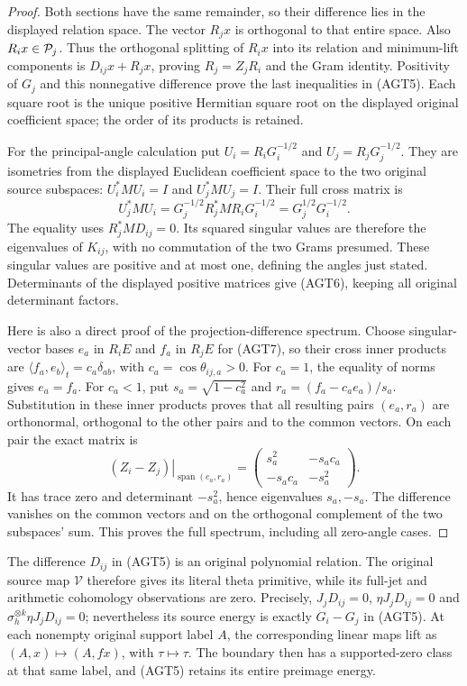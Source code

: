 \begin{proof}
Both sections have the same remainder, so their difference lies
in the displayed relation space. The vector $R_jx$ is orthogonal
to that entire space. Also $R_ix\in\mathcal P_j$. Thus the orthogonal
splitting of $R_ix$ into its relation and minimum-lift components
is $D_{ij}x+R_jx$, proving $R_j=Z_jR_i$ and the Gram identity.
Positivity of $G_j$ and this nonnegative difference prove the
last inequalities in (AGT5). Each square root is the unique
positive Hermitian square root on the displayed original
coefficient space; the order of its products is retained.

For the principal-angle calculation put
$U_i=R_iG_i^{-1/2}$ and $U_j=R_jG_j^{-1/2}$.
They are isometries from the displayed Euclidean coefficient
space to the two original source subspaces: $U_i^*MU_i=I$
and $U_j^*MU_j=I$. Their full cross matrix is
\[
 U_j^*MU_i=G_j^{-1/2}R_j^*MR_iG_i^{-1/2}
          =G_j^{1/2}G_i^{-1/2}.
 \tag{AGT7}
\]
The equality uses $R_j^*MD_{ij}=0$. Its squared singular values
are therefore the eigenvalues of $K_{ij}$, with no commutation
of the two Grams presumed. These singular values are positive
and at most one, defining the angles just stated. Determinants
of the displayed positive matrices give (AGT6), keeping all
original determinant factors.

Here is also a direct proof of the projection-difference spectrum.
Choose singular-vector bases $e_a$ in $R_iE$ and $f_a$ in $R_jE$
for (AGT7), so their cross inner products are
$\langle f_a,e_b\rangle_t=c_a\delta_{ab}$, with
$c_a=\cos\theta_{ij,a}>0$. For $c_a=1$, the equality of norms
gives $e_a=f_a$. For $c_a<1$, put
$s_a=\sqrt{1-c_a^2}$ and $r_a=(f_a-c_ae_a)/s_a$.
Substitution in these inner products proves that all resulting
pairs $(e_a,r_a)$ are orthonormal, orthogonal to the other pairs
and to the common vectors. On each pair the exact matrix is
\[
 \left.(Z_i-Z_j)\right|_{\operatorname{span}(e_a,r_a)}
 =\begin{pmatrix}s_a^2&-s_ac_a\\-s_ac_a&-s_a^2\end{pmatrix}.
 \tag{AGT8}
\]
It has trace zero and determinant $-s_a^2$, hence eigenvalues
$s_a,-s_a$. The difference vanishes on the common vectors
and on the orthogonal complement of the two subspaces' sum.
This proves the full spectrum, including all zero-angle cases.
\end{proof}

The difference $D_{ij}$ in (AGT5) is an original polynomial
relation. The original source map $\mathcal V$ therefore gives
its literal theta primitive, while its full-jet and arithmetic
cohomology observations are zero. Precisely,
$J_jD_{ij}=0$, $\eta J_jD_{ij}=0$ and
$\sigma_h^{\otimes k}\eta J_jD_{ij}=0$; nevertheless its
source energy is exactly $G_i-G_j$ in (AGT5).
At each nonempty original support label $A$, the corresponding
linear maps lift as $(A,x)\mapsto(A,fx)$, with $\tau\mapsto\tau$.
The boundary then has a supported-zero class at that same
label, and (AGT5) retains its entire preimage energy.

